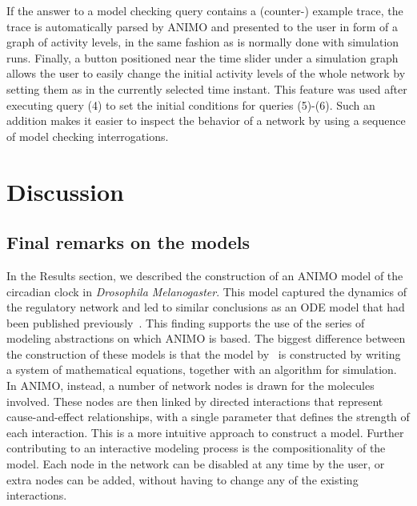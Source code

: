 \documentclass{bmcart}
\begin{document}
If the answer to a model checking query contains a (counter-) example trace, the trace
is automatically parsed by ANIMO and presented to the user in form of a graph of activity levels, in the same fashion
as is normally done with simulation runs.
Finally, a button positioned near the time slider under a simulation graph allows the user to easily change
the initial activity levels of the whole network by setting them as in the currently selected time instant.
This feature was used after executing query (4) to set the initial conditions for queries (5)-(6).
Such an addition makes it easier to inspect the behavior of a network by using a sequence of model checking interrogations.






\section*{Discussion}
\subsection*{Final remarks on the models}
In the Results section, we described the construction of an ANIMO
model of the circadian clock in \emph{Drosophila Melanogaster}. This model
captured the dynamics of the regulatory network and led to similar 
conclusions as an ODE model that had been
published previously~\cite{drosophila-ode-model}. This finding supports the use of
the series of modeling abstractions on which ANIMO is based. The biggest
difference between the construction of these models is that the model by~\cite{drosophila-ode-model}
is constructed by writing a system of mathematical equations, together
with an algorithm for simulation. In ANIMO, instead, a number of network
nodes is drawn for the molecules involved. 
These nodes are then linked by directed
interactions that represent cause-and-effect relationships, with a single parameter 
that defines the strength of each
interaction. This is a more intuitive approach to construct a model.
Further contributing to an interactive modeling process
is the compositionality of the model. Each node in the network
can be disabled at any time by the user, or extra nodes can be added,
without having to change any of the existing interactions.
\end{document}
